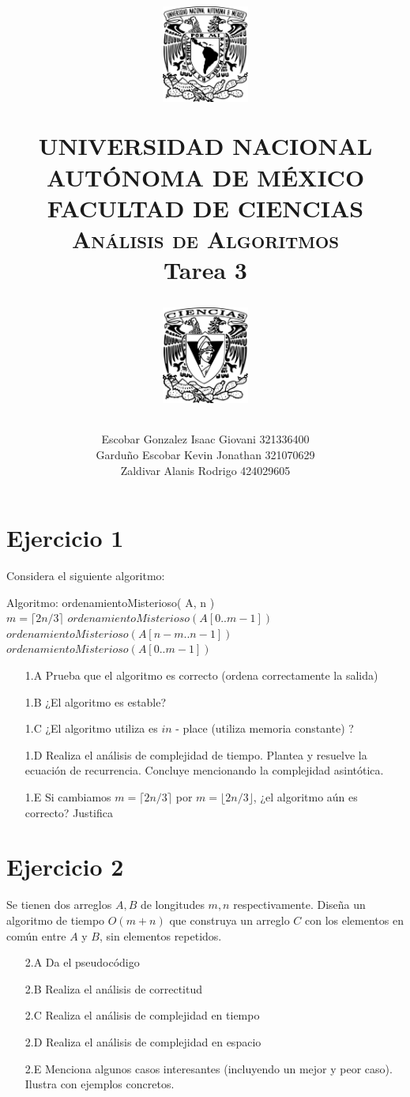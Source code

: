 \documentclass[12pt]{article}
\title{
		\vspace{-0.7in}
		\usefont{OT1}{bch}{b}{n}
		\begin{minipage}{3cm}
        \vspace{-0.5in}
    	\begin{center}
    		\includegraphics[height=3.2cm]{../logo_unam.png}
    	\end{center}
    \end{minipage}\hfill
    \begin{minipage}{10.7cm}

    	\begin{center}
\normalfont \normalsize \textsc{UNIVERSIDAD NACIONAL AUTÓNOMA DE MÉXICO \\ FACULTAD DE CIENCIAS \\ Análisis de Algoritmos } \\
		\huge Tarea 3
    	\end{center}

    \end{minipage}\hfill
    \begin{minipage}{3.2cm}
    \vspace{-0.5in}
    	\begin{center}
    		\includegraphics[height=3.2cm]{../logo_fc.png}
    	\end{center}
    \end{minipage}

\author{Escobar Gonzalez Isaac Giovani \hspace{1cm} 321336400\\
        Garduño Escobar Kevin Jonathan \hspace{0.5cm} 321070629\\
        Zaldivar Alanis Rodrigo \hspace{2.75cm} 424029605 }
\date{}
}
\begin{document}
\maketitle

\section*{Ejercicio 1}
Considera el siguiente algoritmo:\\
\LinesNumbered
\renewcommand{\algorithmcfname}{Algoritmo}
\begin{algorithm}[H]
    Algoritmo: ordenamientoMisterioso( A, n )\\
     {
        $m = \lceil 2n/3\rceil$\;
        $ordenamientoMisterioso(A[0 .. m-1])$ \;
        $ordenamientoMisterioso(A[n-m .. n-1])$ \;
        $ordenamientoMisterioso(A[0 .. m-1])$ \;
    }
\end{algorithm}
\begin{itemize}
    \item[1.A] Prueba que el algoritmo es correcto (ordena correctamente la salida)
    \item[1.B] ¿El algoritmo es estable?
    \item[1.C] ¿El algoritmo utiliza es $in$ - place (utiliza memoria constante) ?
    \item[1.D] Realiza el análisis de complejidad de tiempo. Plantea y resuelve la ecuación de recurrencia. Concluye mencionando la complejidad asintótica.
    \item[1.E] Si cambiamos $m = \lceil 2n/3 \rceil$ por $m = \lfloor 2n/3 \rfloor$, ¿el algoritmo aún es correcto? Justifica
\end{itemize}
\section*{Ejercicio 2}
Se tienen dos arreglos $A, B$ de longitudes $m, n$ respectivamente. Diseña un algoritmo de tiempo $O(m + n)$ que construya un arreglo $C$ con los elementos en común entre $A$ y $B$, sin elementos repetidos.
\begin{itemize}
    \item[2.A] Da el pseudocódigo
    \item[2.B] Realiza el análisis de correctitud
    \item[2.C] Realiza el análisis de complejidad en tiempo
    \item[2.D] Realiza el análisis de complejidad en espacio
    \item[2.E] Menciona algunos casos interesantes (incluyendo un mejor y peor caso). Ilustra con ejemplos concretos.
\end{itemize}
\end{document}
